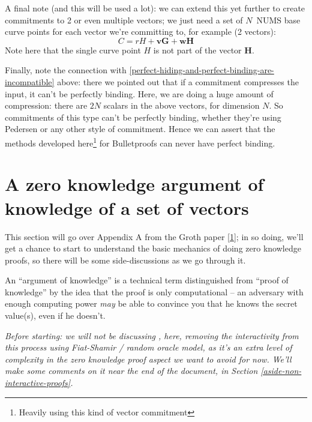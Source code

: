 \documentclass[10pt,a4paper]{article}
\begin{document}
A final note (and this will be used a lot): we can extend this yet
further to create commitments to 2 or even multiple vectors; we just
need a set of $N$~NUMS base curve points for each vector we're committing
to, for example (2 vectors):
\[C = rH + \textbf{vG} + \textbf{wH}\]
Note here that the single curve point $H$ is not part of the vector $\textbf{H}$.

Finally, note the connection with \ref{perfect-hiding-and-perfect-binding-are-incompatible} above: 
there we pointed out that if a commitment compresses the input, it can't be perfectly binding.
Here, we are doing a huge amount of compression: there are $2N$ scalars in
the above vectors, for dimension $N$. So commitments of this type can't be
perfectly binding, whether they're using Pedersen or any other style of
commitment. Hence we can assert that the methods developed here\footnote{Heavily using this kind of vector commitment} for
Bulletproofs can never have perfect binding.

\hypertarget{a-zero-knowledge-argument-of-knowledge-of-a-set-of-vectors}{%
\section[A zero knowledge argument of knowledge of a set of
vectors]{\texorpdfstring{\protect\hypertarget{anchor-23}{}{}A zero
knowledge argument of knowledge of a set of
vectors}{A zero knowledge argument of knowledge of a set of vectors}}\label{a-zero-knowledge-argument-of-knowledge-of-a-set-of-vectors}}

This section will go over Appendix A from the Groth paper
{[}\protect\hyperlink{anchor-7}{1}{]}; in so doing, we'll get a chance
to start to understand the basic mechanics of doing zero knowledge
proofs, so there will be some side-discussions as we go through it.

An ``argument of knowledge'' is a technical term distinguished from
``proof of knowledge'' by the idea that the proof is only computational
-- an adversary with enough computing power \emph{may} be able to
convince you that he knows the secret value(s), even if he doesn't.

\emph{Before starting: we will not be discussing , here, removing the
interactivity from this process using Fiat-Shamir / random oracle model,
as it's an extra level of complexity in the zero knowledge proof aspect
we want to avoid for now. We'll make some comments on it near the end of
the document, in Section \ref{aside-non-interactive-proofs}.}
\end{document}

